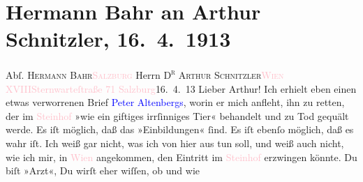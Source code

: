 

               \section[Hermann Bahr an Arthur Schnitzler, 16. 4. 1913]{ Hermann Bahr an Arthur Schnitzler, 16. 4. 1913}\nopagebreak{}\rehead{ }\normalsize\beginnumbering{} \toendnotes[C]{\smallbreak\pagebreak[2]} 
\toendnotes[C]{\smallbreak}\pstart{}{\pb}Abſ. \textsc{Hermann Bahr}\pend{}\pstart{}\textsc{\textcolor{pink}{Salzburg}{}\ledrightnote{\textcolor{pink}{Salzburg}}}\pend{}{\bigskip}\pstart{}
                  Herrn \textsc{D\textsuperscript{r} Arthur
                  Schnitzler}\pend{}\pstart{}\textsc{\textcolor{pink}{Wien XVIII}{}\ledrightnote{\textcolor{pink}{XVIII., Währing}}}\pend{}\pstart{}\textcolor{pink}{Sternwarteſtraße 71}{}\ledrightnote{\textcolor{pink}{Sternwartestraße}}\pend{}{\bigskip}\pstart
           \raggedleft{}{\pb}\textcolor{pink}{Salzburg}{}\ledrightnote{\textcolor{pink}{Salzburg}}{ }16. 4. 13\pend
           \pstart
           Lieber Arthur! Ich erhielt eben einen etwas verworrenen Brief \textcolor{blue}{Peter Altenbergs}{}\ledrightnote{\textcolor{blue}{Peter Altenberg}}, worin er mich anfleht, ihn zu
               retten, der im \textcolor{pink}{Steinhof}{}\ledrightnote{\textcolor{pink}{Otto-Wagner-Spital}} »wie ein giftiges
               irrſinniges Tier« behandelt und zu Tod gequält werde. Es iſt möglich, daß das
               »Einbildungen« ſind. Es iſt ebenſo möglich, daß es wahr iſt. Ich weiß gar nicht, was
               ich von hier aus tun soll, und weiß auch nicht, wie ich mir, in \textcolor{pink}{Wien}{}\ledrightnote{\textcolor{pink}{Wien}} angekommen, den Eintritt im \textcolor{pink}{Steinhof}{}\ledrightnote{\textcolor{pink}{Otto-Wagner-Spital}} erzwingen könnte. Du biſt »Arzt«, Du wirſt eher wiſſen, ob und wie
